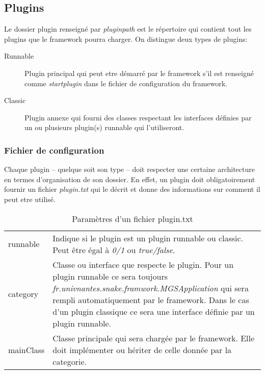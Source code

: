 \documentclass[12pt,a4paper]{article}
\begin{document}
\subsection{Plugins}
Le dossier plugin renseigné par \emph{pluginpath} est le répertoire qui contient 
tout les plugins que le framework pourra charger. On distingue deux types de 
plugins:

\begin{description}
	\item[Runnable] Plugin principal qui peut etre démarré par le framework s'il 
	est renseigné comme \emph{startplugin} dans le fichier de configuration du 
	framework.
	
	\item[Classic] Plugin annexe qui fourni des classes respectant les interfaces 
	définies par un ou plusieurs plugin(s) runnable qui l'utiliseront.
\end{description}

\subsubsection{Fichier de configuration}
Chaque plugin -- quelque soit son type -- doit respecter une certaine architecture 
en termes d'organisation de son dossier. En effet, un plugin doit obligatoirement 
fournir un fichier \emph{plugin.txt} qui le décrit et donne des informations sur 
comment il peut etre utilisé.

\begin{table}[h]\label{tab:plugintxt}
\centering
	\begin{tabular}{lp{10cm}}
		runnable & Indique si le plugin est un plugin runnable ou classic. 
		Peut être égal à \emph{0/1} ou \emph{true/false}.\\				
		
		category & Classe ou interface que respecte le plugin. Pour un plugin 
		runnable ce sera toujours \emph{fr.univnantes.snake.framwork.MGSApplication} 
		qui sera rempli automatiquement par le framework. Dans le cas d'un plugin 
		classique ce sera une interface définie par un plugin runnable.\\
		
		mainClass & Classe principale qui sera chargée par le framework. 
		Elle doit implémenter ou hériter de celle donnée par la categorie.\\
	\end{tabular}	
\caption{Paramètres d'un fichier plugin.txt}
\end{table}
\end{document}
